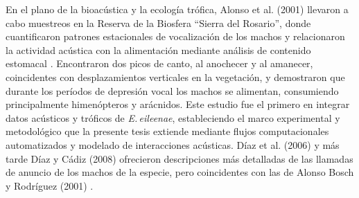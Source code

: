 En el plano de la bioacústica y la ecología trófica, Alonso et 
al. (2001) llevaron a cabo muestreos en la Reserva de la 
Biosfera “Sierra del Rosario”, donde cuantificaron patrones estacionales 
de vocalización de los machos y 
relacionaron la actividad acústica con la alimentación mediante 
análisis de contenido estomacal \cite{alonso2001patrones}. Encontraron 
dos picos de canto, al anochecer y al amanecer, coincidentes 
con desplazamientos verticales en la vegetación, y demostraron 
que durante los períodos de depresión vocal los machos se 
alimentan, consumiendo principalmente himenópteros y arácnidos. 
Este estudio fue el primero en integrar datos acústicos y 
tróficos de \emph{E.\,eileenae}, estableciendo el marco 
experimental y metodológico que la presente tesis extiende 
mediante flujos computacionales automatizados y modelado de 
interacciones acústicas. Díaz et al. (2006) y más tarde Díaz y Cádiz 
(2008) ofrecieron descripciones más detalladas de las llamadas 
de anuncio de los machos de la especie, pero coincidentes con 
las de Alonso Bosch y Rodríguez (2001) \cite{diaz2006guia,diaz2008guia,alonso2001llamadas}.
















